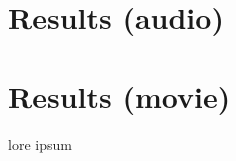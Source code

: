 \documentclass[english]{article}
\begin{document}
\section{Results (audio)}

\section{Results (movie)}
lore ipsum

\end{document}
